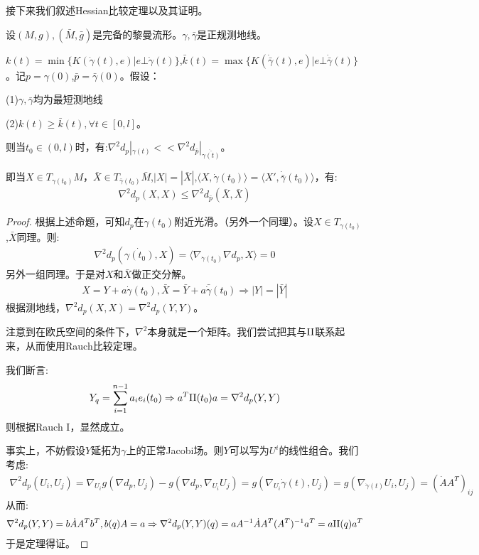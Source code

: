 接下来我们叙述Hessian比较定理以及其证明。
\begin{theorem}[Hessian比较定理]
设$(M,g),(\bar{M},\bar{g})$是完备的黎曼流形。$\gamma,\bar{\gamma}$是正规测地线。

$k(t)=\min \{K(\dot{\gamma}(t),e)|e \bot \dot{\gamma}(t)\}$,$\bar{k}(t)=\max \{K(\dot{\bar{\gamma}}(t),e)|e \bot \dot{ \bar{\gamma}}(t)\}$。记$p=\gamma(0)$,$\bar{p}=\bar{\gamma}(0)$。假设：

(1)$\gamma,\bar{\gamma}$均为最短测地线

(2)$k(t) \geq \bar{k}(t), \forall t \in [0,l]$。

则当$t_0 \in (0,l)$时，有:$\nabla^2 d_p|_{\gamma(t)}<<\nabla^2d_{\bar{p}}|_{\dot{\bar{\gamma(t)}}}$。

即当$X \in T_{\gamma(t_0)}M$，$\bar{X} \in T_{\bar{\gamma}(t_0)}\bar{M}$,$|X|=|\bar{X}|$,$\langle X,\dot{\gamma}(t_0)\rangle=\langle X',\dot{\bar{\gamma}}(t_0)\rangle$，有:
\begin{align*}
    \nabla^2d_p(X,X)\leq \nabla^2 d_{\bar{p}}(\bar{X},\bar{X})
\end{align*}
\end{theorem}
\begin{proof}
    根据上述命题，可知$d_p$在$\gamma(t_0)$附近光滑。（另外一个同理）。设$X \in T_{\gamma(t_0)}$,$\bar{X}$同理。则:
    \begin{align*}
        \nabla^2 d_p(\dot{\gamma(t_0)},X)=\langle  \nabla_{\dot{\gamma}(t_0)} \nabla d_p,X\rangle=0
    \end{align*}
    另外一组同理。于是对$X$和$\bar{X}$做正交分解。
    \begin{align*}
        X=Y+a\dot{\gamma}(t_0),\bar{X}=\bar{Y}+a\bar{\dot{\gamma}}(t_0) \Rightarrow |Y|=|\bar{Y}|
    \end{align*}
    根据测地线，$\nabla^2d_p(X,X)=\nabla^2d_p(Y,Y)$。

    注意到在欧氏空间的条件下，$\nabla^2$本身就是一个矩阵。我们尝试把其与$\mathrm{II}$联系起来，从而使用Rauch比较定理。

    我们断言:
    \begin{align*}
        Y_q=\sum_{i=1}^{n-1}a_i e_i(t_0) \Rightarrow a^T \mathrm{II}(t_0) a=\nabla^2 d_p(Y,Y)
    \end{align*}
    则根据Rauch I，显然成立。

    事实上，不妨假设$Y$延拓为$\gamma$上的正常Jacobi场。则$Y$可以写为$U^i$的线性组合。我们考虑:
    \begin{align*}
        \nabla^2 d_p(U_i,U_j)=\nabla_{U_i} g(\nabla d_p,U_j)-g(\nabla d_p,\nabla_{U_i} U_j)=g(\nabla_{U_i}\dot{\gamma}(t),U_j)=g(\nabla_{\dot{\gamma}(t)}U_i,U_j)=(\dot{A}A^T)_{ij}
    \end{align*}
    从而:
    \begin{align*}
        \nabla^2 d_p(Y,Y)=b\dot{A}A^Tb^{T},b(q)A=a \Rightarrow \nabla^2 d_p(Y,Y)(q)=aA^{-1}\dot{A}A^T (A^{T})^{-1}a^T=a\mathrm{II}(q)a^T
    \end{align*}
    于是定理得证。
\end{proof}
